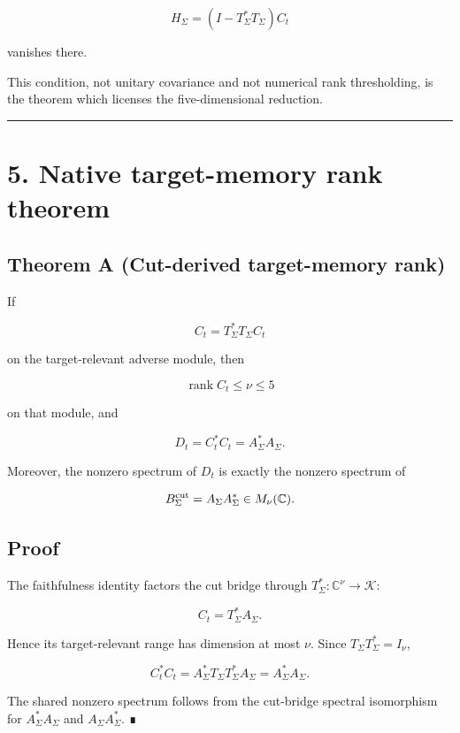 \[
H_\Sigma=(I-T_\Sigma^*T_\Sigma)C_t
\]

vanishes there.

This condition, not unitary covariance and not numerical rank thresholding,
is the theorem which licenses the five-dimensional reduction.

\begin{center}\rule{0.5\linewidth}{0.5pt}\end{center}

\hypertarget{native-target-memory-rank-theorem}{%
\section{5. Native target-memory rank theorem}\label{native-target-memory-rank-theorem}}

\hypertarget{theorem-a-cut-derived-target-memory-rank}{%
\subsection{Theorem A (Cut-derived target-memory rank)}\label{theorem-a-cut-derived-target-memory-rank}}

If

\[
C_t=T_\Sigma^*T_\Sigma C_t
\]

on the target-relevant adverse module, then

\[
\operatorname{rank}C_t\le\nu\le5
\]

on that module, and

\[
D_t=C_t^*C_t=A_\Sigma^*A_\Sigma.
\]

Moreover, the nonzero spectrum of \(D_t\) is exactly the nonzero spectrum of

\[
B_\Sigma^{\rm cut}=A_\Sigma A_\Sigma^*
\in M_\nu(\mathbb C).
\]

\hypertarget{proof}{%
\subsection{Proof}\label{proof}}

The faithfulness identity factors the cut bridge through
\(T_\Sigma^*:\mathbb C^\nu\to\mathcal K\):

\[
C_t=T_\Sigma^*A_\Sigma.
\]

Hence its target-relevant range has dimension at most \(\nu\). Since
\(T_\Sigma T_\Sigma^*=I_\nu\),

\[
C_t^*C_t
=A_\Sigma^*T_\Sigma T_\Sigma^*A_\Sigma
=A_\Sigma^*A_\Sigma.
\]

The shared nonzero spectrum follows from the cut-bridge spectral isomorphism
for \(A_\Sigma^*A_\Sigma\) and \(A_\Sigma A_\Sigma^*\). ∎

